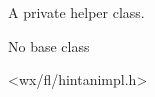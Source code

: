 %
%


\section{}\label{morphinfot}


A private helper class.


No base class


<wx/fl/hintanimpl.h>


